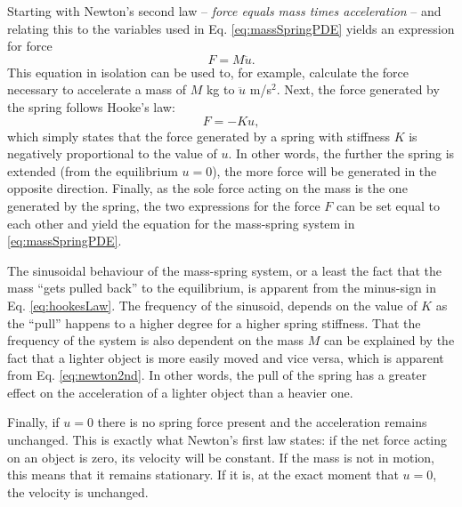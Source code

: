 Starting with Newton's second law -- \textit{force equals mass times acceleration} -- and relating this to the variables used in Eq. \eqref{eq:massSpringPDE} yields an expression for force
\begin{equation}\label{eq:newton2nd}
    F = M\ddot u.
\end{equation}
This equation in isolation can be used to, for example, calculate the force necessary to accelerate a mass of $M$ kg to $\ddot u$ m/s$^2$. Next, the force generated by the spring follows Hooke's law:
\begin{equation}\label{eq:hookesLaw}
    F = -Ku,
\end{equation} 
which simply states that the force generated by a spring with stiffness $K$ is negatively proportional to the value of $u$. In other words, the further the spring is extended (from the equilibrium $u=0$), the more force will be generated in the opposite direction. Finally, as the sole force acting on the mass is the one generated by the spring, the two expressions for the force $F$ can be set equal to each other and yield the equation for the mass-spring system in \eqref{eq:massSpringPDE}. 

The sinusoidal behaviour of the mass-spring system, or a least the fact that the mass ``gets pulled back'' to the equilibrium, is apparent from the minus-sign in Eq. \eqref{eq:hookesLaw}. The frequency of the sinusoid, depends on the value of $K$ as the ``pull'' happens to a higher degree for a higher spring stiffness. 
That the frequency of the system is also dependent on the mass $M$ can be explained by the fact that a lighter object is more easily moved and vice versa, which is apparent from Eq. \eqref{eq:newton2nd}. In other words, the pull of the spring has a greater effect on the acceleration of a lighter object than a heavier one. 



Finally, if $u = 0$ there is no spring force present and the acceleration remains unchanged. This is exactly what Newton's first law states: if the net force acting on an object is zero, its velocity will be constant. If the mass is not in motion, this means that it remains stationary. If it is, at the exact moment that $u=0$, the velocity is unchanged.

